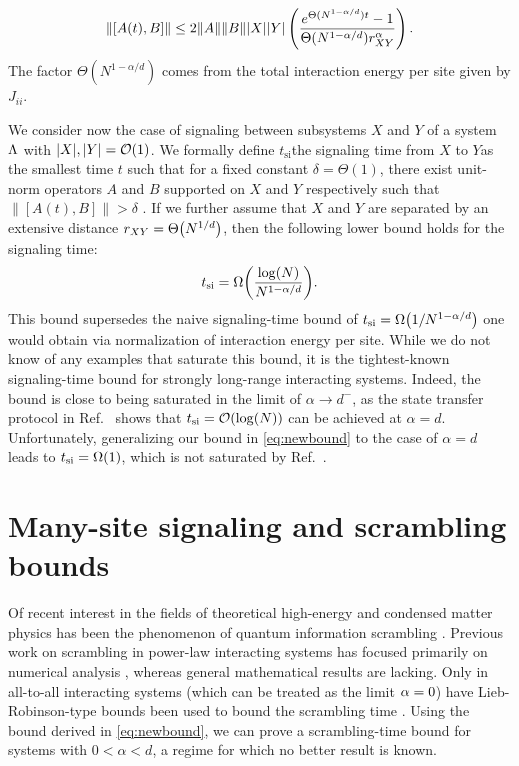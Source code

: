 \begin{equation}
\label{eq:newbound}
	\|[A(t),B]\| \le  2\|A\|\|B\||X||Y|\left(\frac{e^{\Theta(N^{1-\alpha/d})t}-1}{\Theta(N^{1-\alpha/d})r_{XY}^{\alpha}}\right).
\end{equation}
The factor $\Theta(N^{1-\alpha/d})$ comes from the total interaction energy per site given by $J_{ii}$.

We consider now the case of signaling between subsystems $X$ and $Y$ of a system $\Lambda$ with $|X|,|Y|=\O{1}$.
We formally define $t_\text{si}$\dash the signaling time from $X$ to $Y$\dash as the smallest time $t$ such that for a fixed constant $\delta=\Theta(1)$, there exist unit-norm operators $A$ and $B$ supported on $X$ and $Y$ respectively such that $\|[A(t),B]\| > \delta$ \cite{Lashkari2013}.
If we further assume that $X$ and $Y$ are separated by an extensive distance $r_{XY}=\Th{N^{1/d}}$, then the following lower bound holds for the signaling time:
\begin{equation}
	\label{eq:tsi}
	t_\text{si}=  \W{\frac{\log(N)}{N^{1-\al/d}}}.
\end{equation}
This bound supersedes the naive signaling-time bound of $t_\text{si}= \W{ 1/N^{1-\alpha/d}}$ one would obtain via normalization of interaction energy per site.
While we do not know of any examples that saturate this bound, it is the tightest-known signaling-time bound for strongly long-range interacting systems.
Indeed, the bound is close to being saturated in the limit of $\alpha\rightarrow d^-$, as the state transfer protocol in Ref.~\cite{Eldredge2017} shows that $t_\text{si}=\O{\log(N)}$ can be achieved at $\alpha=d$. Unfortunately, generalizing our bound in \cref{eq:newbound} to the case of $\alpha=d$ leads to $t_\text{si}=\W{1}$, which is not saturated by Ref.~\cite{Eldredge2017}.

\section{Many-site signaling and scrambling bounds}
Of recent interest in the fields of theoretical high-energy and condensed matter physics has been the phenomenon of quantum information scrambling \cite{Lashkari2013,Swingle16,SS08,Hayden07,Xu18,Shenker14,Hosur16,Nahum18,Keyserlingk18,Roberts18,Gu17}.
Previous work on scrambling in power-law interacting systems has focused primarily on numerical analysis \cite{Pappalardi18,Zhou18}, whereas general mathematical results are lacking.
Only in all-to-all interacting systems (which can be treated as the limit $\alpha=0$) have Lieb-Robinson-type bounds been used to bound the scrambling time \cite{Lashkari2013}.
Using the bound derived in \cref{eq:newbound}, we can prove a scrambling-time bound for systems with $0<\alpha<d$, a regime for which no better result is known.

